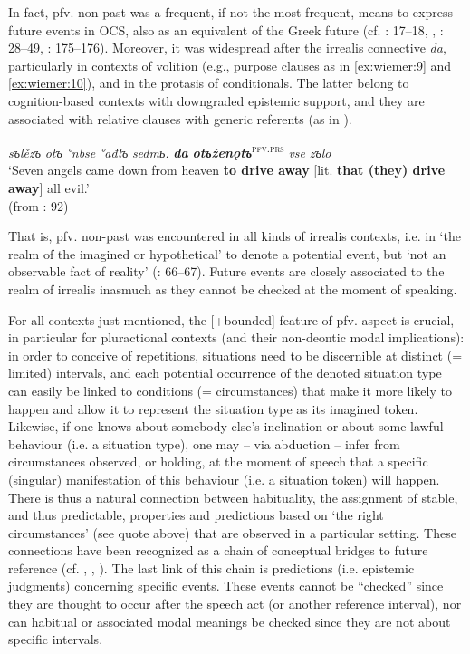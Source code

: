\documentclass[output=paper,colorlinks,citecolor=brown]{langscibook}
\begin{document}
In fact, pfv. non-past was a frequent, if not the most frequent, means to express future events in OCS, also as an equivalent of the Greek future (cf. \cite{Birnbaum1958}: 17--18, \cite{Bunina1959}, \cite{Ivanova-Mirčeva1962}: 28--49, \cite{Večerka1993}: 175--176). Moreover, it was widespread after the irrealis connective \textit{da}, particularly in contexts of volition (e.g., purpose clauses as in \ref{ex:wiemer:9} and \ref{ex:wiemer:10}), and in the protasis of conditionals. The latter belong to cognition-based contexts with downgraded epistemic support, and they are associated with relative clauses with generic referents (as in ).

\ea \label{ex:wiemer:10}
    \textit{sъlězъ} \textit{otъ} \textit{°nbse} \textit{°ađlъ} \textit{sedmь.} \textit{\textbf{da}} \textit{\textbf{otъženǫtъ}}\textsc{\textsuperscript{pfv.prs}} \textit{vse} \textit{zъlo}\\
    ‘Seven angels came down from heaven \textbf{to drive away} [lit. \textbf{that (they) drive away}] all evil.’\\
    \hfill (from \cite{Večerka1993}: 92)
\z

That is, pfv. non-past was encountered in all kinds of irrealis contexts, i.e. in ‘the realm of the imagined or hypothetical’ to denote a potential event, but ‘not an observable fact of reality’ (\cite{Elliott2000}: 66--67). Future events are closely associated to the realm of irrealis inasmuch as they cannot be checked at the moment of speaking.

For all contexts just mentioned, the [+bounded]-feature of pfv. aspect is crucial, in particular for pluractional contexts (and their non-deontic modal implications): in order to conceive of repetitions, situations need to be discernible at distinct (= limited) intervals, and each potential occurrence of the denoted situation type can easily be linked to conditions (= circumstances) that make it more likely to happen and allow it to represent the situation type as its imagined token. Likewise, if one knows about somebody else’s inclination or about some lawful behaviour (i.e. a situation type), one may -- via abduction -- infer from circumstances observed, or holding, at the moment of speech that a specific (singular) manifestation of this behaviour (i.e. a situation token) will happen. There is thus a natural connection between habituality, the assignment of stable, and thus predictable, properties and predictions based on ‘the right circumstances’ (see quote above) that are observed in a particular setting. These connections have been recognized as a chain of conceptual bridges to future reference (cf. \cite{tatevosov_2004}, \cite{Shluinsky2006}, \cite{Sonnenhauser2008}). The last link of this chain is predictions (i.e. epistemic judgments) concerning specific events. These events cannot be “checked” since they are thought to occur after the speech act (or another reference interval), nor can habitual or associated modal meanings be checked since they are not about specific intervals.
\end{document}
